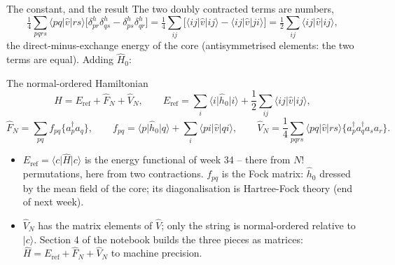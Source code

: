 \documentclass[aspectratio=169,10pt]{beamer}
\newcommand{\ket}[1]{\vert #1\rangle}
\newcommand{\bra}[1]{\langle #1\vert}
\newcommand{\element}[3]{\langle #1\vert #2\vert #3\rangle}
\newcommand{\nc}[1]{\bigl\{#1\bigr\}}
\begin{document}
\begin{frame}{The constant, and the result}
  \footnotesize
  The two doubly contracted terms are numbers,
  \[
    \tfrac14\sum_{pqrs}\element{pq}{\hat{v}}{rs}\bigl[\delta^{h}_{pr}\delta^{h}_{qs}-\delta^{h}_{ps}\delta^{h}_{qr}\bigr]
    =\tfrac14\sum_{ij}\bigl[\element{ij}{\hat{v}}{ij}-\element{ij}{\hat{v}}{ji}\bigr]
    =\tfrac12\sum_{ij}\element{ij}{\hat{v}}{ij},
  \]
  the direct-minus-exchange energy of the core (antisymmetrised elements: the two terms are equal). Adding $\hat{H}_0$:
  \begin{block}{The normal-ordered Hamiltonian}
    \[
      \hat{H}=E_{\mathrm{ref}}+\hat{F}_N+\hat{V}_N,
      \qquad
      E_{\mathrm{ref}}=\sum_i\element{i}{\hat{h}_0}{i}+\frac12\sum_{ij}\element{ij}{\hat{v}}{ij},
    \]
    \[
      \hat{F}_N=\sum_{pq}f_{pq}\nc{a_p^{\dagger}a_q},\qquad
      f_{pq}=\element{p}{\hat{h}_0}{q}+\sum_i\element{pi}{\hat{v}}{qi},
      \qquad
      \hat{V}_N=\frac14\sum_{pqrs}\element{pq}{\hat{v}}{rs}\nc{a_p^{\dagger}a_q^{\dagger}a_sa_r}.
    \]
  \end{block}
  \begin{itemize}
    \item $E_{\mathrm{ref}}=\bra{c}\hat{H}\ket{c}$ is the energy functional of week 34 -- there from $N!$ permutations, here from two contractions. $f_{pq}$ is the \alert{Fock matrix}: $\hat{h}_0$ dressed by the mean field of the core; its diagonalisation is Hartree-Fock theory (end of next week).
    \item $\hat{V}_N$ has the matrix elements of $\hat{V}$; only the string is normal-ordered relative to $\ket{c}$. Section 4 of the notebook builds the three pieces as matrices: $\hat{H}=E_{\mathrm{ref}}+\hat{F}_N+\hat{V}_N$ to machine precision.
  \end{itemize}
\end{frame}
\end{document}
